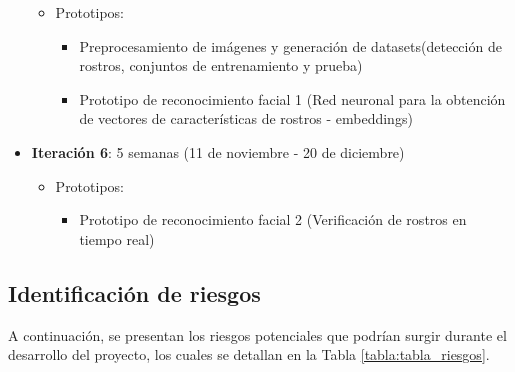 \begin{itemize}
\begin{itemize}
			\item Prototipos:
			\begin{itemize}
				\item Preprocesamiento de imágenes y generación de datasets(detección de rostros, conjuntos de entrenamiento y prueba)
				\item Prototipo de reconocimiento facial 1 (Red neuronal para la obtención de vectores de características de rostros - embeddings)
			\end{itemize}

		\end{itemize}
		
		\item \textbf{Iteración 6}: 5 semanas (11 de noviembre -  20 de diciembre)
		\begin{itemize}
			\item Prototipos:
			\begin{itemize}
				\item Prototipo de reconocimiento facial 2 (Verificación de rostros en tiempo real)
			\end{itemize}
		\end{itemize}
	\end{itemize}
	
	\subsection{Identificación de riesgos}
	
	A continuación, se presentan los riesgos potenciales que podrían surgir durante el desarrollo del proyecto, los cuales se detallan en la Tabla \ref{tabla:tabla_riesgos}.

